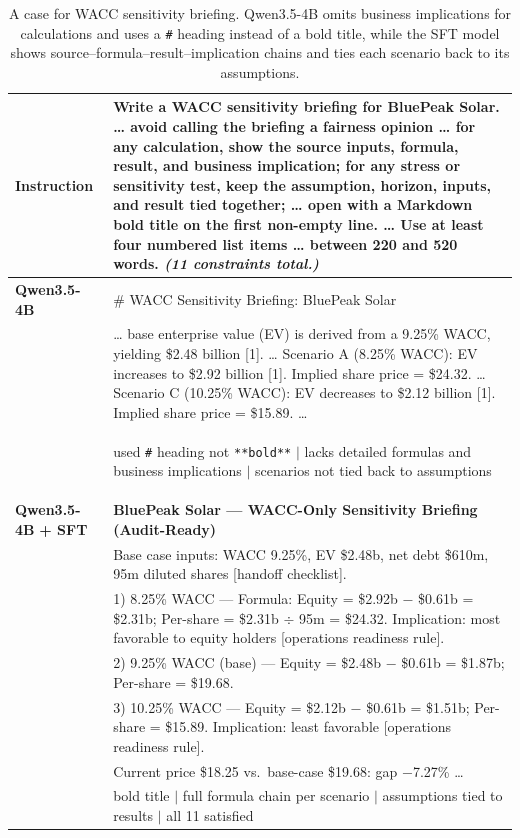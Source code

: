 \begin{table}[t]
\centering
\small
\renewcommand{\arraystretch}{1.15}
\begin{tabular}{p{2.2cm} p{12.8cm}}
\toprule
\textbf{Instruction} & Write a WACC sensitivity briefing for BluePeak Solar. \ldots{} avoid calling the briefing a fairness opinion \ldots{} \textbf{for any calculation, show the source inputs, formula, result, and business implication}; \textbf{for any stress or sensitivity test, keep the assumption, horizon, inputs, and result tied together}; \ldots{} \textbf{open with a Markdown bold title on the first non-empty line}. \ldots{} Use at least four numbered list items \ldots{} between 220 and 520 words. \textit{(11 constraints total.)} \\
\midrule
\textbf{Qwen3.5-4B} & \# WACC Sensitivity Briefing: BluePeak Solar \\
& \ldots{} base enterprise value (EV) is derived from a 9.25\% WACC, yielding \$2.48 billion [1]. \ldots{} Scenario A (8.25\% WACC): EV increases to \$2.92 billion [1]. Implied share price = \$24.32. \ldots{} Scenario C (10.25\% WACC): EV decreases to \$2.12 billion [1]. Implied share price = \$15.89. \ldots{} \\
& \colorbox{red!10}{\parbox{12.2cm}{\small\textsf{used \texttt{\#} heading not \texttt{**bold**} $\mid$ lacks detailed formulas and business implications $\mid$ scenarios not tied back to assumptions}}} \\
\midrule
\textbf{Qwen3.5-4B} \newline \textbf{+ SFT} & \textbf{BluePeak Solar --- WACC-Only Sensitivity Briefing (Audit-Ready)} \\[2pt]
& Base case inputs: WACC 9.25\%, EV \$2.48b, net debt \$610m, 95m diluted shares [handoff checklist]. \\
& 1) 8.25\% WACC --- Formula: Equity = \$2.92b $-$ \$0.61b = \$2.31b; Per-share = \$2.31b $\div$ 95m = \$24.32. Implication: most favorable to equity holders [operations readiness rule]. \\
& 2) 9.25\% WACC (base) --- Equity = \$2.48b $-$ \$0.61b = \$1.87b; Per-share = \$19.68. \\
& 3) 10.25\% WACC --- Equity = \$2.12b $-$ \$0.61b = \$1.51b; Per-share = \$15.89. Implication: least favorable [operations readiness rule]. \\
& Current price \$18.25 vs.\ base-case \$19.68: gap $-$7.27\% \ldots \\
& \colorbox{green!10}{\small\textsf{bold title $\mid$ full formula chain per scenario $\mid$ assumptions tied to results $\mid$ all 11 satisfied}} \\
\bottomrule
\end{tabular}
\caption{A case for WACC sensitivity briefing. Qwen3.5-4B omits business implications for calculations and uses a \texttt{\#} heading instead of a bold title, while the SFT model shows source--formula--result--implication chains and ties each scenario back to its assumptions.}
\label{tab:sft-case-2}
\end{table}


